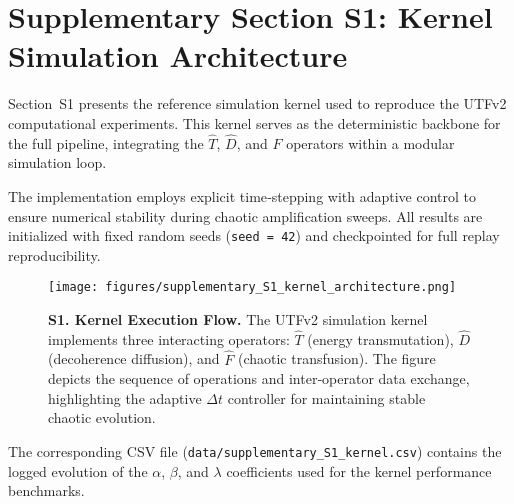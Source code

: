 
\clearpage
\section*{Supplementary Section S1: Kernel Simulation Architecture}

\noindent
Section~S1 presents the reference simulation kernel used to reproduce the
UTFv2 computational experiments. This kernel serves as the deterministic backbone
for the full pipeline, integrating the $\hat{T}$, $\hat{D}$, and $\hat{F}$
operators within a modular simulation loop.

The implementation employs explicit time‐stepping with adaptive control
to ensure numerical stability during chaotic amplification sweeps.
All results are initialized with fixed random seeds (\texttt{seed = 42})
and checkpointed for full replay reproducibility.

\begin{figure}[h!]
    \centering
    \texttt{[image: figures/supplementary\_S1\_kernel\_architecture.png]}
    \caption{
        \textbf{S1. Kernel Execution Flow.}
        The UTFv2 simulation kernel implements three interacting operators:
        $\hat{T}$ (energy transmutation), $\hat{D}$ (decoherence diffusion),
        and $\hat{F}$ (chaotic transfusion). The figure depicts the sequence
        of operations and inter‐operator data exchange, highlighting the
        adaptive $\Delta t$ controller for maintaining stable chaotic evolution.
    }
    \label{fig:s1_kernel}
\end{figure}

\vspace{1em}
The corresponding CSV file
(\texttt{data/supplementary\_S1\_kernel.csv})
contains the logged evolution of the $\alpha$, $\beta$, and $\lambda$
coefficients used for the kernel performance benchmarks.
